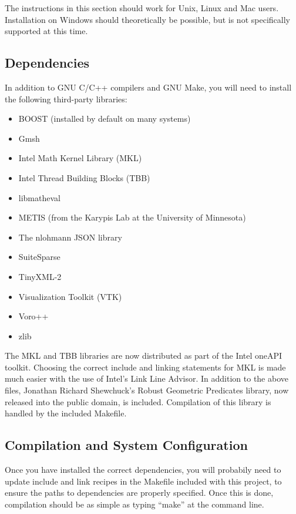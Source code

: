 \documentclass{article}
\begin{document}
The instructions in this section should work for Unix, Linux and Mac users.
Installation on Windows should theoretically be possible, but is not 
specifically supported at this time.

\subsection{Dependencies}
In addition to GNU C/C++ compilers and GNU Make, you will need to install the
following third-party libraries:

\begin{itemize}
\item BOOST (installed by default on many systems)
\item Gmsh ~\cite{gmsh}
\item Intel Math Kernel Library (MKL)
\item Intel Thread Building Blocks (TBB)
\item libmatheval ~\cite{libmatheval}
\item METIS (from the Karypis Lab at the University of Minnesota) ~\cite{metis}
\item The nlohmann JSON library
\item SuiteSparse ~\cite{suitesparse}
\item TinyXML-2
\item Visualization Toolkit (VTK)
\item Voro++ ~\cite{voro++}
\item zlib
\end{itemize}
The MKL and TBB libraries are now distributed as part of the Intel oneAPI
toolkit. Choosing the correct include and linking statements for MKL is made
much easier with the use of Intel's Link Line Advisor. In addition to the
above files, Jonathan Richard Shewchuck's Robust Geometric Predicates library,
\cite{predicates} now released into the public domain, is included. Compilation
of this library is handled by the included Makefile.

\subsection{Compilation and System Configuration}
Once you have installed the correct dependencies, you will probabily need to
update include and link recipes in the Makefile included with this project,
to ensure the paths to dependencies are properly specified. Once this is done,
compilation should be as simple as typing ``make'' at the command line.
\end{document}
